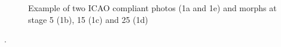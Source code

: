 \begin{figure}
	\label{1c}\hfill
	\label{1d}\hfill
	\label{1e} 
	\caption{Example of two ICAO compliant photos (1a and 1e) and morphs at stage 5 (1b), 15 (1c) and 25 (1d)}
	\label{fig1} 
\end{figure}
.
